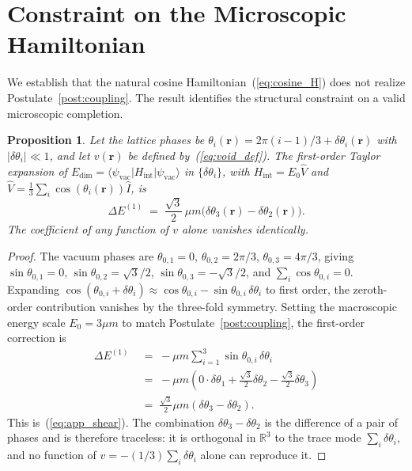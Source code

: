 \documentclass[a4paper,fleqn]{cas-dc}
\theoremstyle{thmstyleone}%
\newtheorem{proposition}[theorem]{Proposition}
\theoremstyle{thmstyletwo}%
\begin{document}
\section{Constraint on the Microscopic Hamiltonian}
\label{app:nogo}

We establish that the natural cosine
Hamiltonian~(\ref{eq:cosine_H}) does not realize
Postulate~\ref{post:coupling}. The result identifies the
structural constraint on a valid microscopic completion.

\begin{proposition}
\label{prop:nogo}
Let the lattice phases be
$\theta_i(\mathbf{r})=2\pi(i-1)/3+\delta\theta_i(\mathbf{r})$
with $|\delta\theta_i|\ll 1$, and let $v(\mathbf{r})$ be
defined by~(\ref{eq:void_def}). The first-order Taylor
expansion of
$E_{\mathrm{dim}}=\langle\psi_{\mathrm{vac}}|H_{\mathrm{int}}
|\psi_{\mathrm{vac}}\rangle$ in $\{\delta\theta_i\}$, with
$H_{\mathrm{int}}=E_0\hat{V}$ and
$\hat{V}=\frac{1}{3}\sum_i\cos(\theta_i(\mathbf{r}))\hat{I}$,
is
\begin{equation}
    \Delta E^{(1)}
    \;=\;
    \frac{\sqrt{3}}{2}\,\mu m
    \bigl(\delta\theta_3(\mathbf{r})
    -\delta\theta_2(\mathbf{r})\bigr).
    \label{eq:app_shear}
\end{equation}
The coefficient of any function of $v$ alone vanishes
identically.
\end{proposition}

\begin{proof}
The vacuum phases are
$\theta_{0,1}=0$, $\theta_{0,2}=2\pi/3$, $\theta_{0,3}=4\pi/3$,
giving $\sin\theta_{0,1}=0$, $\sin\theta_{0,2}=\sqrt{3}/2$,
$\sin\theta_{0,3}=-\sqrt{3}/2$, and
$\sum_i\cos\theta_{0,i}=0$. Expanding 
$\cos(\theta_{0,i}+\delta\theta_i)\approx\cos\theta_{0,i}-\sin\theta_{0,i}\,\delta\theta_i$ 
to first order, the zeroth-order contribution vanishes by the three-fold symmetry. 
Setting the macroscopic energy scale $E_0 = 3\mu m$ to match Postulate~\ref{post:coupling}, 
the first-order correction is
\begin{equation}
\begin{split}
    \Delta E^{(1)}
    &\;=\;
    -\mu m\sum_{i=1}^{3}\sin\theta_{0,i}\,\delta\theta_i \\
    &\;=\;
    -\mu m\!\left(0\cdot\delta\theta_1+\tfrac{\sqrt{3}}{2}
    \delta\theta_2-\tfrac{\sqrt{3}}{2}\delta\theta_3\right) \\
    &\;=\;
    \tfrac{\sqrt{3}}{2}\mu m(\delta\theta_3-\delta\theta_2).
\end{split}
\end{equation}
This is~(\ref{eq:app_shear}). The combination
$\delta\theta_3-\delta\theta_2$ is the difference of a pair of
phases and is therefore traceless: it is orthogonal in
$\mathbb{R}^3$ to the trace mode $\sum_i\delta\theta_i$,
and no function of $v=-(1/3)\sum_i\delta\theta_i$ alone can
reproduce it.
\end{proof}
\end{document}
